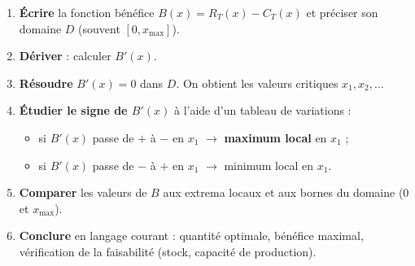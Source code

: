 \documentclass[11pt]{article}
\newcommand{\cle}[1]{{\popxbold\color{popdark}#1}}
\begin{document}
\begin{methode}
\begin{enumerate}
    \item \textbf{Écrire} la fonction bénéfice $B(x) = R_T(x) - C_T(x)$ et préciser son domaine $D$ (souvent $[0, x_{\max}]$).
    \item \textbf{Dériver} : calculer $B'(x)$.
    \item \textbf{Résoudre} $B'(x) = 0$ dans $D$. On obtient les \cle{valeurs critiques} $x_1, x_2, \dots$
    \item \textbf{Étudier le signe de $B'(x)$} à l'aide d'un tableau de variations :
        \begin{itemize}
            \item si $B'(x)$ passe de $+$ à $-$ en $x_1$ $\rightarrow$ \textbf{maximum local} en $x_1$ ;
            \item si $B'(x)$ passe de $-$ à $+$ en $x_1$ $\rightarrow$ minimum local en $x_1$.
        \end{itemize}
    \item \textbf{Comparer} les valeurs de $B$ aux extrema locaux et aux bornes du domaine ($0$ et $x_{\max}$).
    \item \textbf{Conclure} en langage courant : quantité optimale, bénéfice maximal, vérification de la faisabilité (stock, capacité de production).
\end{enumerate}
\end{methode}
\end{document}
